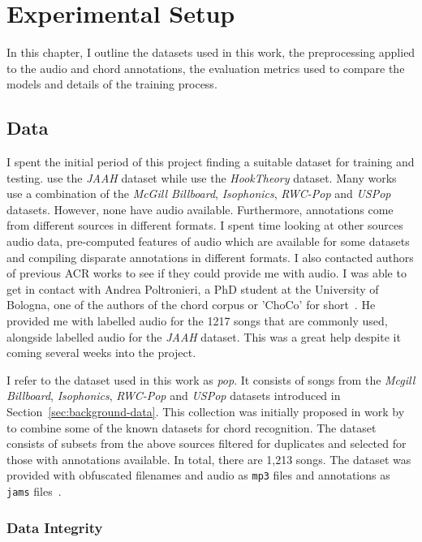 \chapter{Experimental Setup}

In this chapter, I outline the datasets used in this work, the preprocessing applied to the audio and chord annotations, the evaluation metrics used to compare the models and details of the training process.

\section{Data}

I spent the initial period of this project finding a suitable dataset for training and testing. \citet{JAAH} use the \emph{JAAH} dataset while \citet{MelodyTranscriptionViaGenerativePreTraining} use the \emph{HookTheory} dataset. Many works use a combination of the \emph{McGill Billboard}, \emph{Isophonics}, \emph{RWC-Pop} and \emph{USPop} datasets. However, none have audio available. Furthermore, annotations come from different sources in different formats. I spent time looking at other sources audio data, pre-computed features of audio which are available for some datasets and compiling disparate annotations in different formats. I also contacted authors of previous ACR works to see if they could provide me with audio. I was able to get in contact with Andrea Poltronieri, a PhD student at the University of Bologna, one of the authors of the chord corpus or 'ChoCo' for short~\citep{Choco}. He provided me with labelled audio for the 1217 songs that are commonly used, alongside labelled audio for the \emph{JAAH} dataset. This was a great help despite it coming several weeks into the project.

I refer to the dataset used in this work as \emph{pop}. It consists of songs from the \emph{Mcgill Billboard}, \emph{Isophonics}, \emph{RWC-Pop} and \emph{USPop} datasets introduced in Section~\ref{sec:background-data}. This collection was initially proposed in work by \citet{FourTimelyInsights} to combine some of the known datasets for chord recognition. The dataset consists of subsets from the above sources filtered for duplicates and selected for those with annotations available. In total, there are 1,213 songs. The dataset was provided with obfuscated filenames and audio as \texttt{mp3} files and annotations as \texttt{jams} files~\citep{JAMS}. 

\newpage
\subsection{Data Integrity}\label{sec:data-integrity}

